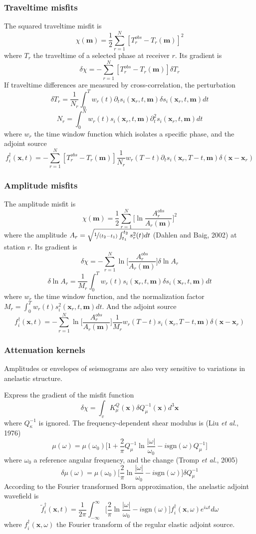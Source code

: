 \documentclass{article}
\newcommand{\mbf}[1]{\mathbf{#1}}
\newcommand{\etal}{\textit{et al.}}
\newcommand{\sgn}{\text{sgn}}
\begin{document}
\subsubsection{Traveltime misfits}
The squared traveltime misfit is
\[ \chi(\mbf m)=\frac{1}{2}\sum_{r=1}^N[T_r^{obs}-T_r(\mbf m)]^2 \]
where $T_r$ the traveltime of a selected phase at receiver $r$. Its gradient is
\[ \delta\chi=-\sum_{r=1}^N[T_r^{obs}-T_r(\mbf m)]\delta T_r \]
If traveltime differences are measured by cross-correlation, the perturbation
\[ \delta T_r=\frac{1}{N_r}\int_0^Tw_r(t)\partial_ts_i(\mbf x_r,t,\mbf m)\delta s_i(\mbf x_r,t,\mbf m)dt \]
\[ N_r=\int_0^Nw_r(t)s_i(\mbf x_r,t,\mbf m)\partial_t^2s_i(\mbf x_r,t,\mbf m)dt \]
where $w_r$ the time window function which isolates a specific phase, and the adjoint source
\[ f_i^\dagger(\mbf x,t)=-\sum_{r=1}^N[T_r^{obs}-T_r(\mbf m)]\frac{1}{N_r}w_r(T-t)\partial_ts_i(\mbf x_r,T-t,\mbf m)\delta(\mbf x-\mbf x_r) \]\par
\subsubsection{Amplitude misfits}
The amplitude misfit is
\[ \chi(\mbf m)=\frac{1}{2}\sum_{r=1}^N\Big[\ln\frac{A_r^{obs}}{A_r(\mbf m)}\Big]^2 \]
where the amplitude $A_r=\sqrt{\nicefrac{1}{(t_2-t_1)}\int_{t_1}^{t_2}s_r^2(t)dt}$ (Dahlen and Baig, 2002) at station $r$. Its gradient is
\[ \delta\chi=-\sum_{r=1}^N\ln\Big[\frac{A_r^{obs}}{A_r(\mbf m)}\Big]\delta\ln A_r \]
\[ \delta\ln A_r=\frac{1}{M_r}\int_0^Tw_r(t)s_i(\mbf x_r,t,\mbf m)\delta s_i(\mbf x_r,t,\mbf m)dt \]
where $w_r$ the time window function, and the normalization factor $M_r=\int_0^Tw_r(t)s_i^2(\mbf x_r,t,\mbf m)dt$. And the adjoint source
\[ f_i^\dagger(\mbf x,t)=-\sum_{r=1}^N\ln\Big[\frac{A_r^{obs}}{A_r(\mbf m)}\Big]\frac{1}{M_r}w_r(T-t)s_i(\mbf x_r,T-t,\mbf m)\delta(\mbf x-\mbf x_r) \]\par
\subsubsection{Attenuation kernels}
Amplitudes or envelopes of seismograms are also very sensitive to variations in anelastic structure.\par
Express the gradient of the misfit function
\[ \delta\chi=\int_vK_\mu^Q(\mbf x)\delta Q_\mu^{-1}(\mbf x)d^3\mbf x \]
where $Q_\kappa^{-1}$ is ignored. The frequency-dependent shear modulus is (Liu \etal, 1976)
\[ \mu(\omega)=\mu(\omega_0)\Big[1+\frac{2}{\pi}Q_\mu^{-1}\ln\frac{|\omega|}{\omega_0}-i\sgn(\omega)Q_\mu^{-1}\Big] \]
where $\omega_0$ a reference angular frequency, and the change (Tromp \etal, 2005)
\[ \delta\mu(\omega)=\mu(\omega_0)\Big[\frac{2}{\pi}\ln\frac{|\omega|}{\omega_0}-i\sgn(\omega)\Big]\delta Q_\mu^{-1} \]
According to the Fourier transformed Born approximation, the anelastic adjoint wavefield is
\[ \tilde f_i^\dagger(\mbf x,t)=\frac{1}{2\pi}\int_{-\infty}^\infty\Big[\frac{2}{\pi}\ln\frac{|\omega|}{\omega_0}-i\sgn(\omega)\Big]f_i^\dagger(\mbf x,\omega)e^{i\omega t}d\omega \]
where $f_i^\dagger(\mbf x,\omega)$ the Fourier transform of the regular elastic adjoint source.\par
\end{document}
